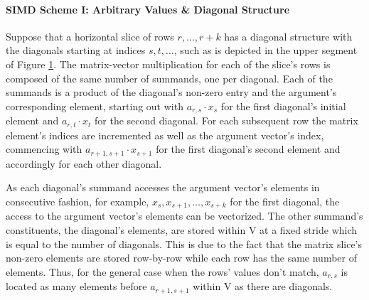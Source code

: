 
        \paragraph{SIMD Scheme I: Arbitrary Values \& Diagonal Structure}

          Suppose that a horizontal slice of rows $r, \ldots, r+k$ has a diagonal structure with the diagonals starting
          at indices $s, t, \ldots $, such as is depicted in the upper segment of Figure
          \ref{fig:simd-scheme-i-data-layout}. The matrix-vector multiplication for each of the slice's rows is composed
          of the same number of summands, one per diagonal. Each of the summands is a product of the diagonal's non-zero
          entry and the argument's corresponding element, starting out with $a_{r,s} \cdot x_s$ for the first diagonal's
          initial element and $a_{r,t} \cdot x_t$ for the second diagonal. For each subsequent row the matrix element's
          indices are incremented as well as the argument vector's index, commencing with $a_{r+1, s+1} \cdot x_{s+1}$
          for the first diagonal's second element and accordingly for each other diagonal.

          \begin{figure}[H]
            \centering
            \captionsetup{width=0.9\columnwidth}
            
            \label{fig:simd-scheme-i-data-layout}
          \end{figure}

          As each diagonal's summand accesses the argument vector's elements in consecutive fashion, for example, $x_s,
          x_{s+1}, \ldots, x_{s + k}$ for the first diagonal, the access to the argument vector's elements can be
          vectorized. The other summand's constituents, the diagonal's elements, are stored within V at a fixed stride
          which is equal to the number of diagonals. This is due to the fact that the matrix slice's non-zero elements
          are stored row-by-row while each row has the same number of elements. Thus, for the general case when the
          rows' values don't match, $a_{r, s}$ is located as many elements before $a_{r+1, s+1}$ within V as there are
          diagonals.


